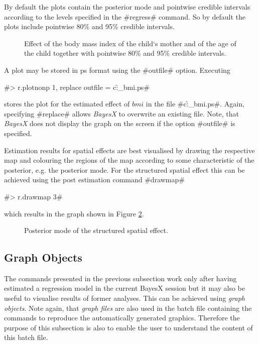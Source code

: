 \documentclass{article}
\begin{document}
By default the plots contain the posterior mode and pointwise
credible intervals according to the levels specified in the
#regress# command. So by default the plots include pointwise 80\%
and 95\% credible intervals.

\begin{figure}[ht]
\begin{center}
 {\it\caption{Effect of
the body mass index of the child`s mother and of the age of the
child together with pointwise 80\% and 95\% credible intervals.
\label{bmi1}}}
\end{center}
\end{figure}

A plot may be stored in ps format using the #outfile# option.
Executing

#> r.plotnonp 1, replace outfile = c:\data\f_bmi.ps#

stores the plot for the estimated effect of $bmi$ in the file
#c:\data\f_bmi.ps#. Again, specifying #replace# allows {\it
BayesX} to overwrite an existing file. Note, that {\it BayesX}
does not display the graph on the screen if the option #outfile#
is specified.

Estimation results for spatial effects are best visualised by
drawing the respective map and colouring the regions of the map
according to some characteristic of the posterior, e.g. the
posterior mode. For the structured spatial effect this can be
achieved using the post estimation command #drawmap#

#> r.drawmap 3#

which results in the graph shown in Figure \ref{spat1}.

\begin{figure}[ht]
\begin{center}
{\it\caption{Posterior mode of the structured spatial
effect.\label{spat1}}}
\end{center}
\end{figure}


\subsection{Graph Objects}

The commands presented in the previous subsection work only after
having estimated a regression model in the current BayesX session
but it may also be useful to visualise results of former analyses.
This can be achieved using {\em graph objects}. Note again, that
{\em graph files} are also used in the batch file containing the
commands to reproduce the automatically generated graphics.
Therefore the purpose of this subsection is also to enable the
user to understand the content of this batch file.
\end{document}
